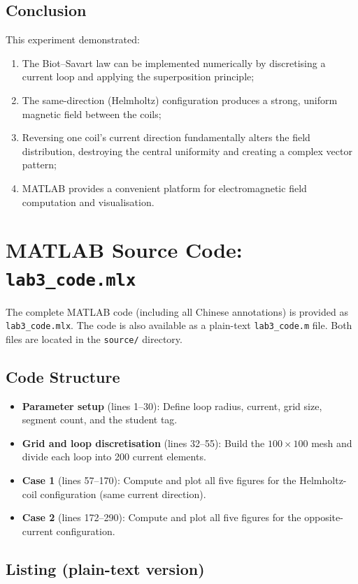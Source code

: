 \documentclass[12pt,a4paper]{article}
\begin{document}
\subsection{Conclusion}

This experiment demonstrated:
\begin{enumerate}[label=(\roman*)]
    \item The Biot--Savart law can be implemented numerically by discretising a current loop and applying the superposition principle;
    \item The same-direction (Helmholtz) configuration produces a strong, uniform magnetic field between the coils;
    \item Reversing one coil's current direction fundamentally alters the field distribution, destroying the central uniformity and creating a complex vector pattern;
    \item MATLAB provides a convenient platform for electromagnetic field computation and visualisation.
\end{enumerate}

\newpage
\appendix
\section{MATLAB Source Code: \texttt{lab3\_code.mlx}}\label{app:code}

The complete MATLAB code (including all Chinese annotations) is provided as \texttt{lab3\_code.mlx}. The code is also available as a plain-text \texttt{lab3\_code.m} file. Both files are located in the \texttt{source/} directory.

\subsection*{Code Structure}
\begin{itemize}
    \item \textbf{Parameter setup} (lines 1--30): Define loop radius, current, grid size, segment count, and the student tag.
    \item \textbf{Grid and loop discretisation} (lines 32--55): Build the $100 \times 100$ mesh and divide each loop into 200 current elements.
    \item \textbf{Case 1} (lines 57--170): Compute and plot all five figures for the Helmholtz-coil configuration (same current direction).
    \item \textbf{Case 2} (lines 172--290): Compute and plot all five figures for the opposite-current configuration.
\end{itemize}

\subsection*{Listing (plain-text version)}

\end{document}
